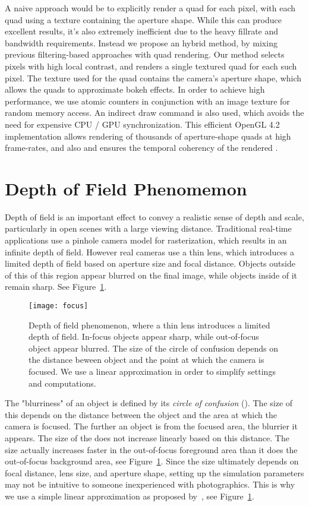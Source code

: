 A naive approach would be to explicitly render a quad for each pixel, with each quad using a texture containing the aperture shape. While this can produce excellent results, it's also extremely inefficient due to the heavy fillrate and bandwidth requirements. Instead we propose an hybrid method, by mixing previous filtering-based approaches with quad rendering. Our method selects pixels with high local contrast, and renders a single textured quad for each such pixel. The texture used for the quad contains the camera's aperture shape, which allows the quads to approximate bokeh effects. In order to achieve high performance, we use atomic counters in conjunction with an image texture for random memory access. An indirect draw command is also used, which avoids the need for expensive CPU / GPU synchronization. This efficient OpenGL 4.2 implementation allows rendering of thousands of aperture-shape quads at high frame-rates, and also and ensures the temporal coherency of the rendered \bokeh.

\section{Depth of Field Phenomemon}\label{Derousiers:DOFPhenomenon}
Depth of field is an important effect to convey a realistic sense of depth and scale, particularly in open scenes with a large viewing distance. Traditional real-time applications use a pinhole camera model for rasterization, which results in an infinite depth of field. However real cameras use a thin lens, which introduces a limited depth of field based on aperture size and focal distance. Objects outside of this of this region appear blurred on the final image, while objects inside of it remain sharp. See Figure~\ref{DeRousiers:focus}.

	\begin{figure}[htb]\centering
	\texttt{[image: focus]}
	\caption{Depth of field phenomenon, where a thin lens introduces a limited depth of field. In-focus objects appear sharp, while out-of-focus object appear blurred. The size of the circle of confusion depends on the distance beween object and the point at which the camera is focused. We use a linear approximation in order to simplify settings and computations. }
	\label{DeRousiers:focus}
	\end{figure}


The "blurriness" of an object is defined by its \emph{circle of confusion} (\coc). The size of this \coc depends on the distance between the object and the area at which the camera is focused. The further an object is from the focused area, the blurrier it appears. The size of the \coc does not increase linearly based on this distance. The size actually increases faster in the out-of-focus foreground area than it does the out-of-focus background area, see Figure~\ref{DeRousiers:focus}. Since the \coc size ultimately depends on focal distance, lens size, and aperture shape, setting up the simulation parameters may not be intuitive to someone inexperienced with photographics. This is why we use a simple linear approximation as proposed by~\cite{Hammon07}, see Figure~\ref{DeRousiers:focus}.

